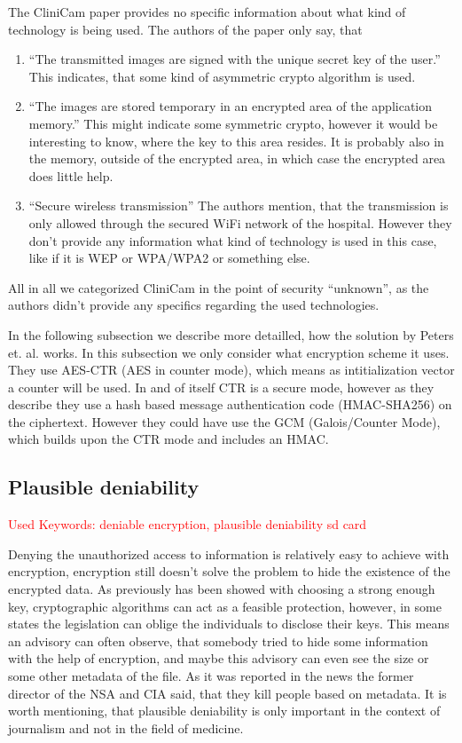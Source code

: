 \documentclass[12pt,a4paper,titlepage,oneside]{scrartcl}
\newcommand\todo[1]{\textcolor{red}{#1}}
\begin{document}
The CliniCam paper provides no specific information about what kind of technology is being used.
The authors of the paper only say, that
\begin{enumerate}[label={\alph*}]
  \item ``The transmitted images are signed with the unique secret key of the user.''
    This indicates, that some kind of asymmetric crypto algorithm is used.
  \item ``The images are stored temporary in an encrypted area of the application memory.''
    This might indicate some symmetric crypto, however it would be interesting to know, where the key to this area resides.
    It is probably also in the memory, outside of the encrypted area, in which case the encrypted area does little help.
  \item ``Secure wireless transmission''
    The authors mention, that the transmission is only allowed through the secured WiFi network of the hospital.
    However they don't provide any information what kind of technology is used in this case, like if it is WEP or WPA/WPA2 or something else.
\end{enumerate}
All in all we categorized CliniCam in the point of security ``unknown'', as the authors didn't provide any specifics regarding the used technologies. \cite{pmid25565678}

In the following subsection we describe more detailled, how the solution by Peters et. al. works.
In this subsection we only consider what encryption scheme it uses.
They use AES-CTR (AES in counter mode), which means as intitialization vector a counter will be used.
In and of itself CTR is a secure mode, however as they describe they use a hash based message authentication code (HMAC-SHA256) on the ciphertext. \cite{peters2015defy}
However they could have use the GCM (Galois/Counter Mode), which builds upon the CTR mode and includes an HMAC. \cite{mcgrew2004security}

\subsection{Plausible deniability}
\todo{Used Keywords: deniable encryption, plausible deniability sd card}

Denying the unauthorized access to information is relatively easy to achieve with encryption, encryption still doesn't solve the problem to hide the existence of the encrypted data.
As previously has been showed with choosing a strong enough key, cryptographic algorithms can act as a feasible protection, however, in some states the legislation can oblige the individuals to disclose their keys.
This means an advisory can often observe, that somebody tried to hide some information with the help of encryption, and maybe this advisory can even see the size or some other metadata of the file.
As it was reported in the news the former director of the NSA and CIA said, that they kill people based on metadata. \cite{coleMetadata}
It is worth mentioning, that plausible deniability is only important in the context of journalism and not in the field of medicine.
\end{document}
